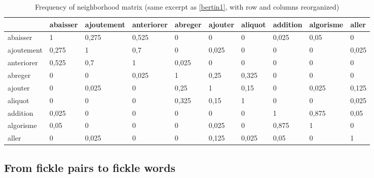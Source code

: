 \documentclass[preprint]{elsarticle}
\begin{document}
\begin{table}
\begin{small}

\begin{tabular}{|l|l|l|l|l|l|l|l|l|l|}
\hline
 & abaisser & ajoutement & anteriorer& abreger & ajouter & aliquot & addition & algorisme & aller \\ \hline
abaisser  & \cellcolor{gris} 1 & \cellcolor{gris} 0,275 & \cellcolor{gris} 0,525 & 0 & 0 & 0 & \cellcolor{grisclair} 0,025 & \cellcolor{grisclair} 0,05 & 0 \\ \hline
ajoutement  & \cellcolor{gris} 0,275 & \cellcolor{gris} 1 & \cellcolor{gris} 0,7 & 0 & \cellcolor{grisclair} 0,025 & 0 & 0 & 0 & \cellcolor{grisclair} 0,025 \\ \hline
anteriorer & \cellcolor{gris} 0,525 & \cellcolor{gris} 0,7 & \cellcolor{gris} 1 & \cellcolor{grisclair} 0,025 & 0 & 0 & 0 & 0 & 0 \\ \hline
abreger & 0 & 0 &\cellcolor{grisclair} 0,025& \cellcolor{gris} 1 & \cellcolor{gris} 0,25 & \cellcolor{gris} 0,325 & 0 & 0 & 0 \\ \hline
ajouter & 0 & \cellcolor{grisclair} 0,025 & 0& \cellcolor{gris} 0,25 & \cellcolor{gris} 1 & \cellcolor{grisclair} 0,15 & 0 & \cellcolor{grisclair} 0,025 & \cellcolor{grisclair} 0,125 \\ \hline
aliquot & 0 & 0 & 0& \cellcolor{gris} 0,325 & \cellcolor{grisclair} 0,15 & \cellcolor{gris} 1 & 0 & 0 & \cellcolor{grisclair} 0,025 \\ \hline
addition & \cellcolor{grisclair} 0,025 & 0 & 0& 0 & 0 & 0 & \cellcolor{gris} 1 & \cellcolor{gris} 0,875 & \cellcolor{grisclair} 0,05 \\ \hline
algorisme & \cellcolor{grisclair} 0,05 & 0 & 0& 0 & \cellcolor{grisclair} 0,025 & 0 & \cellcolor{gris} 0,875 & \cellcolor{gris} 1 & 0 \\ \hline
aller & 0 & \cellcolor{grisclair} 0,025 & 0& 0 & \cellcolor{grisclair} 0,125 & \cellcolor{grisclair} 0,025 & \cellcolor{grisclair} 0,05 & 0 & \cellcolor{gris} 1 \\ \hline
\end{tabular}
\end{small}
\caption{Frequency of neighborhood matrix (same excerpt as \ref{bertin1}, with row and columns reorganized)}
\label{bertin2}
\end{table}

\subsection{From fickle pairs to fickle words}
\label{fromfrom}
\end{document}
